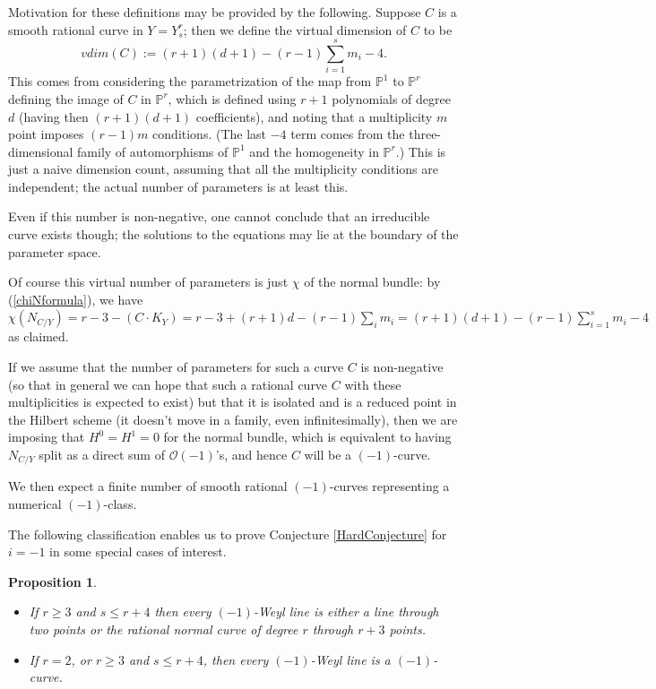 \documentclass[12pt]{article}
\newtheorem{proposition}[equation]{Proposition}
\numberwithin{equation}{section}
\numberwithin{subeq}{equation}
\def\calO{\mathcal{O}}
\def\bbP{\mathbb{P}}
\begin{document}
Motivation for these definitions may be provided by the following.
Suppose $C$ is a smooth rational curve in $Y=Y^r_s$;
then we define the virtual dimension of $C$ to be
\begin{equation}\label{param}
vdim(C):=(r+1)(d+1) - (r-1)\sum_{i=1}^s m_i - 4.
\end{equation}
This comes from considering the parametrization
of the map from $\bbP^1$ to $\bbP^r$ defining the image of $C$ in $\bbP^r$,
which is defined using $r+1$ polynomials of degree $d$
(having then $(r+1)(d+1)$ coefficients),
and noting that a multiplicity $m$ point imposes $(r-1)m$ conditions.
(The last $-4$ term comes from the three-dimensional family of automorphisms of $\bbP^1$
and the homogeneity in $\bbP^r$.)
This is just a naive dimension count, assuming that all the multiplicity conditions are independent;
the actual number of parameters is at least this.

Even if this number is non-negative,
one cannot conclude that an irreducible curve exists though;
the solutions to the equations may lie at the boundary of the parameter space.

Of course this virtual number of parameters is just $\chi$ of the normal bundle:
by (\ref{chiNformula}), we have
$\chi(N_{C/Y}) = r-3-(C\cdot K_Y) = r-3 +(r+1)d - (r-1)\sum_i m_i = (r+1)(d+1) - (r-1)\sum_{i=1}^s m_i - 4$
as claimed.

If we assume that the number of parameters for such a curve $C$ is non-negative
(so that in general we can hope that
such a rational curve $C$ with these multiplicities is expected to exist)
but that it is isolated and is a reduced point in the Hilbert scheme
(it doesn't move in a family, even infinitesimally),
then we are imposing that $H^0 = H^1 = 0$ for the normal bundle,
which is equivalent to having $N_{C/Y}$ split as a direct sum of $\calO(-1)$'s,
and hence $C$ will be a $(-1)$-curve.

We then expect a finite number of smooth rational $(-1)$-curves
representing a numerical $(-1)$-class.

The following classification enables us to prove Conjecture \ref{HardConjecture} for $i = -1$ in some special cases of interest.

\begin{proposition}\label{s leq r+4 (-1)-curves}
\begin{itemize}
\item[(a)] If $r \geq 3$ and $s \leq r+4$ then every $(-1)$-Weyl line is either a line through two points or the rational normal curve of degree $r$ through $r+3$ points.
\item[(b)] If $r = 2$, or $r \geq 3$ and $s \leq r+4$, then every $(-1)$-Weyl line is a $(-1)$-curve.
\end{itemize}
\end{proposition}
\end{document}
